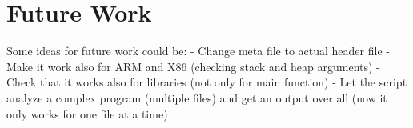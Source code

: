\chapter{Future Work}

Some ideas for future work could be:
- Change meta file to actual header file
- Make it work also for ARM and X86 (checking stack and heap arguments)
- Check that it works also for libraries (not only for main function)
- Let the script analyze a complex program (multiple files) and get an output over all (now it only works for one file at a time)

